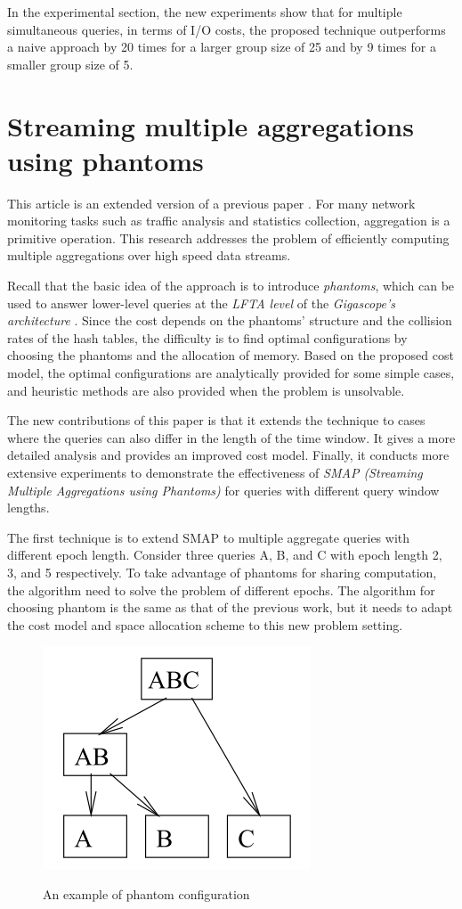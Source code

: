 \documentclass[paper=a4, fontsize=18pt]{article} %
\numberwithin{equation}{section} %
\numberwithin{figure}{section} %
\numberwithin{table}{section} %
\begin{document}
In the experimental section, the new experiments show that for multiple simultaneous queries, in terms of I/O costs, the proposed technique outperforms a naive approach by 20 times for a larger group size of 25 and by 9 times for a smaller group size of 5.

\section{Streaming multiple aggregations using phantoms \cite{ZKOSZ10}}

This article is an extended version of a previous paper \cite{ZKOS05}. For many network monitoring tasks such as traffic analysis and statistics collection, aggregation is a primitive operation. This research addresses the problem of efficiently computing multiple aggregations over high speed data streams.

Recall that the basic idea of the approach is to introduce \emph{phantoms}, which can be used to answer lower-level queries at the \emph{LFTA level} of the \emph{Gigascope's architecture} \cite{CJSS03}. Since the cost depends on the phantoms' structure and the collision rates of the hash tables, the difficulty is to find optimal configurations by choosing the phantoms and the allocation of memory. Based on the proposed cost model, the optimal configurations are analytically provided for some simple cases, and heuristic methods are also provided when the problem is unsolvable.

The new contributions of this paper is that it extends the technique to cases where the queries can also differ in the length of the time window. It gives a more detailed analysis and provides an improved cost model. Finally, it conducts more extensive experiments to demonstrate the effectiveness of \emph{SMAP (Streaming Multiple Aggregations using Phantoms)} for queries with different query window lengths.

The first technique is to extend SMAP to multiple aggregate queries with different epoch length. Consider three queries A, B, and C with epoch length 2, 3, and 5 respectively. To take advantage of phantoms for sharing computation, the algorithm need to solve the problem of different epochs. The algorithm for choosing phantom is the same as that of the previous work, but it needs to adapt the cost model and space allocation scheme to this new problem setting.

\begin{figure}[h]
  \centering
  \includegraphics[width=.3\linewidth]{8_29_phantom.png}\\
  \caption{An example of phantom configuration}\label{fig:phantom}
\end{figure}
\end{document}
